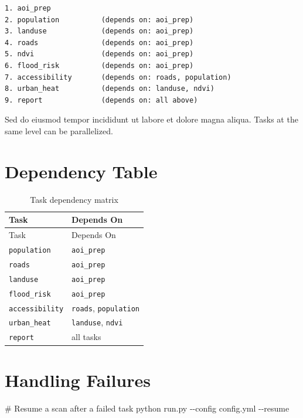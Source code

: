 \documentclass[
  letterpaper,
  DIV=11,
  numbers=noendperiod]{scrreprt}
\newenvironment{Shaded}{\begin{snugshade}}{\end{snugshade}}
\newcommand{\AttributeTok}[1]{\textcolor[rgb]{0.40,0.45,0.13}{#1}}
\newcommand{\CommentTok}[1]{\textcolor[rgb]{0.37,0.37,0.37}{#1}}
\newcommand{\ExtensionTok}[1]{\textcolor[rgb]{0.00,0.23,0.31}{#1}}
\newcommand{\NormalTok}[1]{\textcolor[rgb]{0.00,0.23,0.31}{#1}}
\begin{document}
\begin{verbatim}
1. aoi_prep
2. population          (depends on: aoi_prep)
3. landuse             (depends on: aoi_prep)
4. roads               (depends on: aoi_prep)
5. ndvi                (depends on: aoi_prep)
6. flood_risk          (depends on: aoi_prep)
7. accessibility       (depends on: roads, population)
8. urban_heat          (depends on: landuse, ndvi)
9. report              (depends on: all above)
\end{verbatim}

Sed do eiusmod tempor incididunt ut labore et dolore magna aliqua. Tasks
at the same level can be parallelized.

\section{Dependency Table}\label{dependency-table}

\begin{longtable}[]{@{}ll@{}}
\caption{Task dependency matrix}\label{tbl-deps}\tabularnewline
\toprule\noalign{}
Task & Depends On \\
\midrule\noalign{}
\endfirsthead
\toprule\noalign{}
Task & Depends On \\
\midrule\noalign{}
\endhead
\bottomrule\noalign{}
\endlastfoot
\texttt{population} & \texttt{aoi\_prep} \\
\texttt{roads} & \texttt{aoi\_prep} \\
\texttt{landuse} & \texttt{aoi\_prep} \\
\texttt{flood\_risk} & \texttt{aoi\_prep} \\
\texttt{accessibility} & \texttt{roads}, \texttt{population} \\
\texttt{urban\_heat} & \texttt{landuse}, \texttt{ndvi} \\
\texttt{report} & all tasks \\
\end{longtable}

\section{Handling Failures}\label{handling-failures}

\begin{Shaded}
\begin{Highlighting}[]
\CommentTok{\# Resume a scan after a failed task}
\ExtensionTok{python}\NormalTok{ run.py }\AttributeTok{{-}{-}config}\NormalTok{ config.yml }\AttributeTok{{-}{-}resume}
\end{Highlighting}
\end{Shaded}
\end{document}
